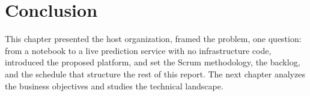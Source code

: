 \section{Conclusion}
This chapter presented the host organization, framed the problem, one
question: from a notebook to a live prediction service with no infrastructure
code, introduced the proposed platform, and set the Scrum methodology, the
backlog, and the schedule that structure the rest of this report. The next
chapter analyzes the business objectives and studies the technical landscape.

